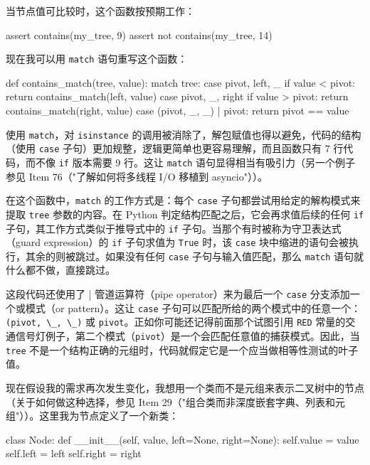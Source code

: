 当节点值可比较时，这个函数按预期工作：

\begin{codebox}[python]
assert contains(my_tree, 9)
assert not contains(my_tree, 14)
\end{codebox}

现在我可以用 \verb|match| 语句重写这个函数：

\begin{codebox}[python]
def contains_match(tree, value):
    match tree:
        case pivot, left, _ if value < pivot:
            return contains_match(left, value)
        case pivot, _, right if value > pivot:
            return contains_match(right, value)
        case (pivot, _, _) | pivot:
            return pivot == value
\end{codebox}

使用 \verb|match|，对 \verb|isinstance| 的调用被消除了，解包赋值也得以避免，代码的结构（使用 \verb|case| 子句）更加规整，逻辑更简单也更容易理解，而且函数只有 7 行代码，而不像 \verb|if| 版本需要 9 行。这让 \verb|match| 语句显得相当有吸引力（另一个例子参见 Item 76（"了解如何将多线程 I/O 移植到 asyncio"））。

在这个函数中，\verb|match| 的工作方式是：每个 \verb|case| 子句都尝试用给定的解构模式来提取 \verb|tree| 参数的内容。在 Python 判定结构匹配之后，它会再求值后续的任何 \verb|if| 子句，其工作方式类似于推导式中的 \verb|if| 子句。当那个有时被称为守卫表达式（guard expression）的 \verb|if| 子句求值为 \verb|True| 时，该 \verb|case| 块中缩进的语句会被执行，其余的则被跳过。如果没有任何 \verb|case| 子句与输入值匹配，那么 \verb|match| 语句就什么都不做，直接跳过。

这段代码还使用了 \verb||| 管道运算符（pipe operator）来为最后一个 \verb|case| 分支添加一个或模式（or pattern）。这让 \verb|case| 子句可以匹配所给的两个模式中的任意一个：\verb|(pivot, \_, \_)| 或 \verb|pivot|。正如你可能还记得前面那个试图引用 \verb|RED| 常量的交通信号灯例子，第二个模式（\verb|pivot|）是一个会匹配任意值的捕获模式。因此，当 \verb|tree| 不是一个结构正确的元组时，代码就假定它是一个应当做相等性测试的叶子值。

现在假设我的需求再次发生变化，我想用一个类而不是元组来表示二叉树中的节点（关于如何做这种选择，参见 Item 29（"组合类而非深度嵌套字典、列表和元组"））。这里我为节点定义了一个新类：

\begin{codebox}[python]
class Node:
    def __init__(self, value, left=None, right=None):
        self.value = value
        self.left = left
        self.right = right
\end{codebox}

